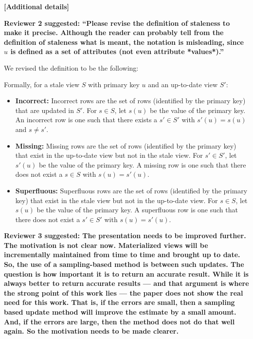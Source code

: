 \vspace{2.0em}

\noindent\textbf{[Additional details]}

\textbf{Reviewer 2 suggested: “Please revise the definition of staleness to make it precise. Although the reader can probably tell from the definition of staleness what is meant, the notation is misleading, since $u$ is defined as a set of attributes (not even attribute *values*).”}

We revised the definition to be the following:

Formally, for a stale view $S$ with primary key $u$ and an up-to-date view $S'$:
\begin{itemize}[noitemsep] \sloppy
	\item \textbf{Incorrect: } Incorrect rows are the set of rows (identified by the primary key) that are updated in $S'$. For $s \in S$, let $s(u)$ be the value of the primary key. An incorrect row is one such that there exists a $s' \in S'$ with $s'(u) = s(u)$ and $s \ne s'$.
	\item \textbf{Missing: } Missing rows are the set of rows (identified by the primary key) that exist in the up-to-date view but not in the stale view. For $s' \in S'$, let $s'(u)$ be the value of the primary key. A missing row is one such that there does not exist a $s \in S$ with $s(u) = s'(u)$.
	\item \textbf{Superfluous: } Superfluous rows are the set of rows (identified by the primary key) that exist in the stale view but not in the up-to-date view. For $s \in S$, let $s(u)$ be the value of the primary key. A superfluous row is one such that there does not exist a $s' \in S'$ with $s(u) = s'(u)$.
\end{itemize}

\vspace{1.5em}

\textbf{Reviewer 3 suggested: The presentation needs to be improved further. The motivation is not clear now. Materialized views will be incrementally maintained from time to time and brought up to date. So, the use of a sampling-based method is between such updates. The question is how important it is to return an accurate result. While it is always better to return accurate results --- and that argument is where the strong point of this work lies --- the paper does not show the real need for this work. That is, if the errors are small, then a sampling based update method will improve the estimate by a small amount. And, if the errors are large, then the method does not do that well again. So the motivation needs to be made clearer.}

